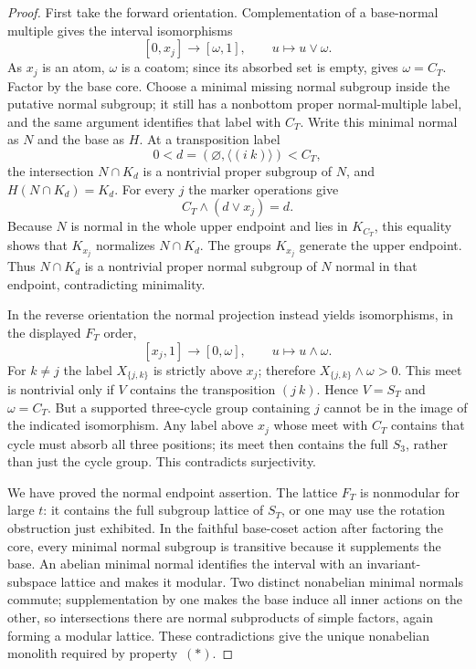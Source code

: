 \begin{proof}
First take the forward orientation.  Complementation of a
base-normal multiple gives the interval isomorphisms
\[
 [0,x_j]\longrightarrow[\omega,1],\qquad u\longmapsto u\vee\omega.
\]
As $x_j$ is an atom, $\omega$ is a coatom; since its absorbed set
is empty,  gives $\omega=C_T$.
Factor by the base core.  Choose a minimal missing normal subgroup
inside the putative normal subgroup; it still has a nonbottom
proper normal-multiple label, and the same argument identifies
that label with $C_T$.  Write this minimal normal as $N$ and the
base as $H$.  At a transposition label
\[
 0<d=(\varnothing,\langle(i\ k)\rangle)<C_T,
\]
the intersection $N\cap K_d$ is a nontrivial proper subgroup of
$N$, and $H(N\cap K_d)=K_d$.
For every $j$ the marker operations give
\[
 C_T\wedge(d\vee x_j)=d.
\]
Because $N$ is normal in the whole upper endpoint and lies in
$K_{C_T}$, this equality shows that $K_{x_j}$ normalizes
$N\cap K_d$.  The groups $K_{x_j}$ generate the upper endpoint.
Thus $N\cap K_d$ is a nontrivial proper normal subgroup of $N$
normal in that endpoint, contradicting minimality.

In the reverse orientation the normal projection instead yields
isomorphisms, in the displayed $F_T$ order,
\[
 [x_j,1]\longrightarrow[0,\omega],\qquad u\longmapsto u\wedge\omega.
\]
For $k\ne j$ the label $X_{\{j,k\}}$ is strictly above $x_j$;
therefore $X_{\{j,k\}}\wedge\omega>0$.
This meet is nontrivial only if $V$ contains the transposition
$(j\ k)$.  Hence $V=S_T$ and $\omega=C_T$.
But a supported three-cycle group containing $j$ cannot be in
the image of the indicated isomorphism.  Any label above $x_j$
whose meet with $C_T$ contains that cycle must absorb all three
positions; its meet then contains the full $S_3$, rather than
just the cycle group.  This contradicts surjectivity.

We have proved the normal endpoint assertion.  The lattice $F_T$
is nonmodular for large $t$: it contains the full subgroup lattice
of $S_T$, or one may use the rotation obstruction just exhibited.
In the faithful base-coset action after factoring the core, every
minimal normal subgroup is transitive because it supplements the
base.  An abelian minimal normal identifies the interval with an
invariant-subspace lattice and makes it modular.  Two distinct
nonabelian minimal normals commute; supplementation by one makes
the base induce all inner actions on the other, so intersections
there are normal subproducts of simple factors, again forming a
modular lattice.  These contradictions give the unique nonabelian
monolith required by property~\((*)\).
\end{proof}

